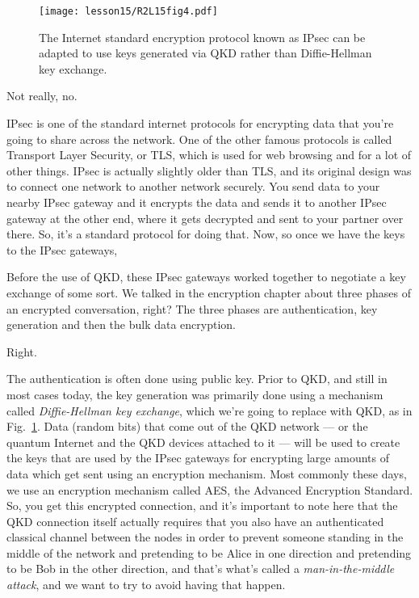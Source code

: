 \begin{figure}[t]
    \centering
    \texttt{[image: lesson15/R2L15fig4.pdf]}
    \caption[IPsec with QKD]{The Internet standard encryption protocol known as IPsec can be adapted to use keys generated via QKD rather than Diffie-Hellman key exchange.}
    \label{fig:15-4-ipsec-with-qkd}
\end{figure}

\mmm Not really, no.

\rrr IPsec is one of the standard internet protocols for encrypting data that you're going to share across the network. One of the other famous protocols is called Transport Layer Security, or TLS, which is used for web browsing and for a lot of other things. IPsec is actually slightly older than TLS, and its original design was to connect one network to another network securely. You send data to your nearby IPsec gateway and it encrypts the data and sends it to another IPsec gateway at the other end, where it gets decrypted and sent to your partner over there. So, it's a standard protocol for doing that. Now, so once we have the keys to the IPsec gateways,

Before the use of QKD, these IPsec gateways worked together to negotiate a key exchange of some sort. We talked in the encryption chapter about three phases of an encrypted conversation, right? The three phases are authentication, key generation and then the bulk data encryption.

\mmm Right.

\rrr The authentication is often done using public key. Prior to QKD, and still in most cases today, the key generation was primarily done using a mechanism called \emph{Diffie-Hellman key exchange}, which we're going to replace with QKD, as in Fig.~\ref{fig:15-4-ipsec-with-qkd}. Data (random bits) that come out of the QKD network --- or the quantum Internet and the QKD devices attached to it --- will be used to create the keys that are used by the IPsec gateways for encrypting large amounts of data which get sent using an encryption mechanism. Most commonly these days, we use an encryption mechanism called AES, the Advanced Encryption Standard. So, you get this encrypted connection, and it's important to note here that the QKD connection itself actually requires that you also have an authenticated classical channel between the nodes in order to prevent someone standing in the middle of the network and pretending to be Alice in one direction and pretending to be Bob in the other direction, and that's what's called a \emph{man-in-the-middle attack}, and we want to try to avoid having that happen.

